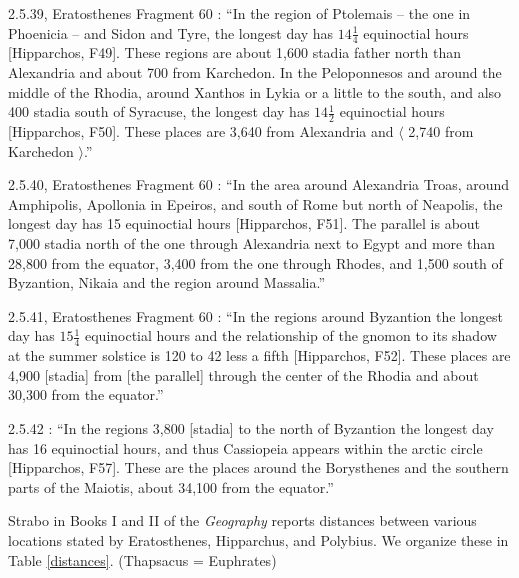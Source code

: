 \documentclass{amsart}
\theoremstyle{definition}
\begin{document}
2.5.39, Eratosthenes Fragment 60  \cite[pp.~148--149]{strabo}: ``In the region of Ptolemais -- the one in Phoenicia -- and Sidon and Tyre, the longest day has $14 \frac{1}{4}$ equinoctial hours [Hipparchos, F49]. These regions
are about 1,600 stadia father north than Alexandria and about 700 from Karchedon. In the Peloponnesos and around the middle of the Rhodia,
around Xanthos in Lykia or a little to the south, and also 400 stadia south of Syracuse, the longest day has $14 \frac{1}{2}$ equinoctial hours [Hipparchos, F50]. These places are 3,640 from
Alexandria and $\langle$ 2,740 from Karchedon $\rangle$.''

2.5.40, Eratosthenes Fragment 60 \cite[p.~149]{strabo}: ``In the area around Alexandria Troas, around Amphipolis, Apollonia in Epeiros, and south of Rome but north of Neapolis, the longest day has
15 equinoctial hours [Hipparchos, F51]. The parallel is about 7,000 stadia north of the one through Alexandria next to Egypt and more than 28,800 from the equator, 3,400 from the one through Rhodes,
and 1,500 south of Byzantion, Nikaia and the region around Massalia.''

2.5.41, Eratosthenes Fragment 60  \cite[p.~149]{strabo}: ``In the regions around Byzantion the longest day has $15 \frac{1}{4}$ equinoctial hours and the relationship of the gnomon to its shadow at the summer
solstice is 120 to 42 less a fifth [Hipparchos, F52]. These places are 4,900 [stadia] from [the parallel] through the center of the Rhodia and about 30,300 from the equator.''


2.5.42 \cite[p.~149]{strabo}: ``In the regions 3,800 [stadia] to the north of Byzantion the longest day has 16 equinoctial hours, and thus Cassiopeia appears within the arctic
circle [Hipparchos, F57]. These are the places around the Borysthenes and the southern parts of the Maiotis, about 34,100 from the equator.''

Strabo in Books I and II of the {\em Geography} \cite{strabo} reports  distances
between various locations stated by Eratosthenes, Hipparchus, and Polybius. We organize these
in Table \ref{distances}.
(Thapsacus = Euphrates)
\end{document}
